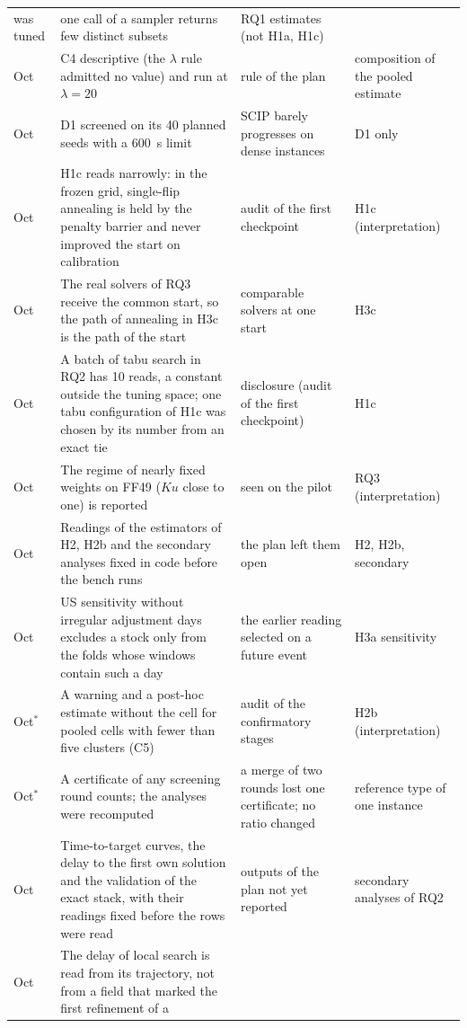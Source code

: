 {\begin{longtable}{>{\raggedright\arraybackslash}p{}>{\raggedright\arraybackslash}p{}>{\raggedright\arraybackslash}p{}>{\raggedright\arraybackslash}p{}}
was tuned & one call of a sampler returns few distinct subsets & RQ1 estimates (not H1a, H1c) \\
11 Oct & C4 descriptive (the $\lambda$ rule admitted no value) and run at $\lambda = 20$ & rule of the plan & composition
of the pooled estimate \\
12 Oct & D1 screened on its 40 planned seeds with a 600~s limit & SCIP barely progresses on dense instances & D1 only \\
12 Oct & H1c reads narrowly: in the frozen grid, single-flip annealing is held by the penalty barrier and never improved
the start on calibration & audit of the first checkpoint & H1c (interpretation) \\
12 Oct & The real solvers of RQ3 receive the common start, so the path of annealing in H3c is the path of the start &
comparable solvers at one start & H3c \\
12 Oct & A batch of tabu search in RQ2 has 10 reads, a constant outside the tuning space; one tabu configuration of H1c
was chosen by its number from an exact tie & disclosure (audit of the first checkpoint) & H1c \\
12 Oct & The regime of nearly fixed weights on FF49 ($K u$ close to one) is reported & seen on the pilot & RQ3
(interpretation) \\
12 Oct & Readings of the estimators of H2, H2b and the secondary analyses fixed in code before the bench runs & the
plan left them open & H2, H2b, secondary \\
12 Oct & US sensitivity without irregular adjustment days excludes a stock only from the folds whose windows contain
such a day & the earlier reading selected on a future event & H3a sensitivity \\
17 Oct$^{\ast}$ & A warning and a post-hoc estimate without the cell for pooled cells with fewer than five clusters
(C5) & audit of the confirmatory stages & H2b (interpretation) \\
17 Oct$^{\ast}$ & A certificate of any screening round counts; the analyses were recomputed & a merge of two rounds
lost one certificate; no ratio changed & reference type of one instance \\
17 Oct & Time-to-target curves, the delay to the first own solution and the validation of the exact stack, with their
readings fixed before the rows were read & outputs of the plan not yet reported & secondary analyses of RQ2 \\
17 Oct & The delay of local search is read from its trajectory, not from a field that marked the first refinement of a

\end{longtable}}
